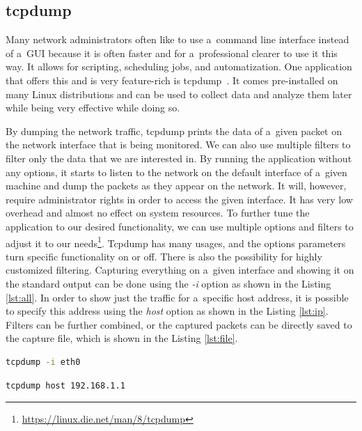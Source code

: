 \documentclass[
  printed,     %
  color,       %
  oneside,     %
  nosansbold,  %
  nocolorbold, %
  nolof,         %
  nolot,         %
]{fithesis4}
\begin{document}
\subsection{tcpdump}

Many network administrators often like to use a~command line interface instead of a~GUI because it is often faster and for a~professional clearer to use it this way. It allows for scripting, scheduling jobs, and automatization. One application that offers this and is very feature-rich is tcpdump~\cite{Anintrod85:online}. It comes pre-installed on many Linux distributions and can be used to collect data and analyze them later while being very effective while doing so. 

By dumping the network traffic, tcpdump prints the data of a~given packet on the network interface that is being monitored. We can also use multiple filters to filter only the data that we are interested in. By running the application without any options, it starts to listen to the network on the default interface of a~given machine and dump the packets as they appear on the network. It will, however, require administrator rights in order to access the given interface. It has very low overhead and almost no effect on system resources. To further tune the application to our desired functionality, we can use multiple options and filters to adjust it to our needs\footnote{\url{https://linux.die.net/man/8/tcpdump}}. Tcpdump has many usages, and the options parameters turn specific functionality on or off. There is also the possibility for highly customized filtering. Capturing everything on a~given interface and showing it on the standard output can be done using the \textit{-i} option as shown in the Listing \ref{lst:all}. In order to show just the traffic for a~specific host address, it is possible to specify this address using the \textit{host} option as shown in the Listing \ref{lst:ip}. Filters can be further combined, or the captured packets can be directly saved to the capture file, which is shown in the Listing \ref{lst:file}.

\begin{lstlisting}[language=bash, caption={Capture everything on given interface}, label={lst:all}]
tcpdump -i eth0
\end{lstlisting}

\begin{lstlisting}[language=bash, caption={Filter just the traffic going to or from given address}, label={lst:ip}]
tcpdump host 192.168.1.1
\end{lstlisting}
\end{document}
